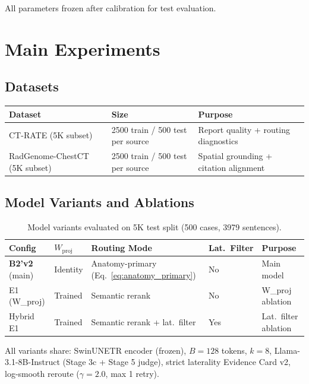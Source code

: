 \documentclass[11pt,a4paper]{article}
\begin{document}
All parameters frozen after calibration for test evaluation.

\section{Main Experiments}
\label{sec:experiments}

\subsection{Datasets}

\begin{table}[H]
\centering\small
\begin{tabular}{lll}
\toprule
Dataset & Size & Purpose \\
\midrule
CT-RATE (5K subset) & 2500 train / 500 test per source & Report quality + routing diagnostics \\
RadGenome-ChestCT (5K subset) & 2500 train / 500 test per source & Spatial grounding + citation alignment \\
\bottomrule
\end{tabular}
\end{table}

\subsection{Model Variants and Ablations}

\begin{table}[H]
\centering\small
\caption{Model variants evaluated on 5K test split (500 cases, 3979 sentences).}
\begin{tabular}{lllll}
\toprule
Config & $W_{\mathrm{proj}}$ & Routing Mode & Lat.\ Filter & Purpose \\
\midrule
\textbf{B2'v2} (main) & Identity & Anatomy-primary (Eq.~\ref{eq:anatomy_primary}) & No & Main model \\
E1 (W\_proj) & Trained & Semantic rerank & No & W\_proj ablation \\
Hybrid E1 & Trained & Semantic rerank + lat.\ filter & Yes & Lat.\ filter ablation \\
\bottomrule
\end{tabular}
\end{table}

All variants share: SwinUNETR encoder (frozen), $B{=}128$ tokens, $k{=}8$, Llama-3.1-8B-Instruct (Stage 3c + Stage 5 judge), strict laterality Evidence Card v2, log-smooth reroute ($\gamma{=}2.0$, max 1 retry).
\end{document}
